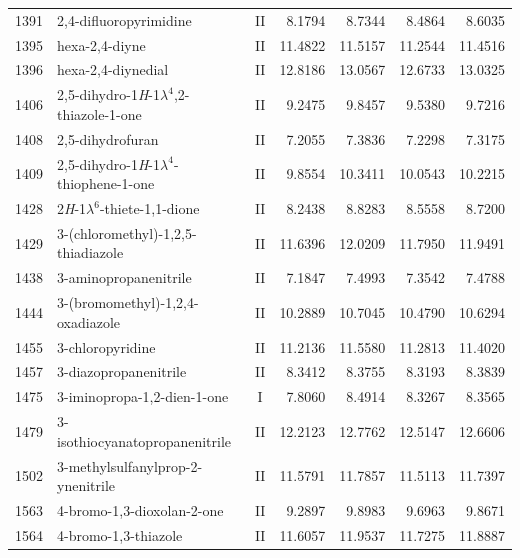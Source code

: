 \begin{longtable}{rlcd{2.5}d{2.5}d{2.5}d{2.5}}
    1391 & 2,4-difluoropyrimidine                                 & II & 8.1794  & 8.7344  & 8.4864  & 8.6035  \\
    1395 & hexa-2,4-diyne                                         & II & 11.4822 & 11.5157 & 11.2544 & 11.4516 \\
    1396 & hexa-2,4-diynedial                                     & II & 12.8186 & 13.0567 & 12.6733 & 13.0325 \\
    1406 & 2,5-dihydro-1\textit{H}-1$\lambda^4$,2-thiazole-1-one  & II & 9.2475  & 9.8457  & 9.5380  & 9.7216  \\
    1408 & 2,5-dihydrofuran                                       & II & 7.2055  & 7.3836  & 7.2298  & 7.3175  \\
    1409 & 2,5-dihydro-1\textit{H}-1$\lambda^4$-thiophene-1-one   & II & 9.8554  & 10.3411 & 10.0543 & 10.2215 \\
    1428 & 2\textit{H}-1$\lambda^6$-thiete-1,1-dione              & II & 8.2438  & 8.8283  & 8.5558  & 8.7200  \\
    1429 & 3-(chloromethyl)-1,2,5-thiadiazole                     & II & 11.6396 & 12.0209 & 11.7950 & 11.9491 \\
    1438 & 3-aminopropanenitrile                                  & II & 7.1847  & 7.4993  & 7.3542  & 7.4788  \\
    1444 & 3-(bromomethyl)-1,2,4-oxadiazole                       & II & 10.2889 & 10.7045 & 10.4790 & 10.6294 \\
    1455 & 3-chloropyridine                                       & II & 11.2136 & 11.5580 & 11.2813 & 11.4020 \\
    1457 & 3-diazopropanenitrile                                  & II & 8.3412  & 8.3755  & 8.3193  & 8.3839  \\
    1475 & 3-iminopropa-1,2-dien-1-one                            & I  & 7.8060  & 8.4914  & 8.3267  & 8.3565  \\
    1479 & 3-isothiocyanatopropanenitrile                         & II & 12.2123 & 12.7762 & 12.5147 & 12.6606 \\
    1502 & 3-methylsulfanylprop-2-ynenitrile                      & II & 11.5791 & 11.7857 & 11.5113 & 11.7397 \\
    1563 & 4-bromo-1,3-dioxolan-2-one                             & II & 9.2897  & 9.8983  & 9.6963  & 9.8671  \\
    1564 & 4-bromo-1,3-thiazole                                   & II & 11.6057 & 11.9537 & 11.7275 & 11.8887 \\

\end{longtable}
